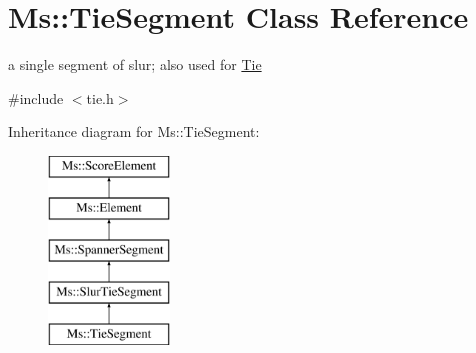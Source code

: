 \hypertarget{class_ms_1_1_tie_segment}{}\section{Ms\+:\+:Tie\+Segment Class Reference}
\label{class_ms_1_1_tie_segment}


a single segment of slur; also used for \hyperlink{class_ms_1_1_tie}{Tie}  




{\ttfamily \#include $<$tie.\+h$>$}

Inheritance diagram for Ms\+:\+:Tie\+Segment\+:\begin{figure}[H]
\begin{center}
\leavevmode
\includegraphics[height=5.000000cm]{class_ms_1_1_tie_segment}
\end{center}
\end{figure}
